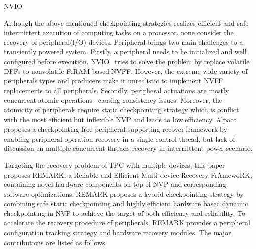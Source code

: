 NVIO~\cite{li2016hw}


Although the above mentioned checkpointing strategies realizes efficient and safe intermittent execution of computing tasks on a processor, none consider the recovery of peripheral(I/O) devices.
Peripheral brings two main challenges to a transiently powered system.
Firstly, a peripheral needs to be initialized and well configured before execution. 
NVIO~\cite{li2016hw} tries to solve the problem by replace volatile DFFs to nonvolatile FeRAM based NVFF. 
However, the extreme wide variety of peripherals types and producers make it unrealistic to implement NVFF replacements to all peripherals. 
Secondly, peripheral actuations are mostly concurrent atomic operations~\cite{LuciaSurvey} causing consistency issues.
Moreover, the atomicity of peripherals require static checkpointing strategy which is conflict with the most efficient but inflexible NVP and leads to low efficiency.
Alpaca~\cite{lucia2017Alpaca} proposes a checkpointing-free peripheral supporting recover framework by enabling peripheral operation recovery in a single control thread, but lack of discussion on multiple concurrent threads recovery in intermittent power scenario.

Targeting the recovery problem of TPC with multiple devices, this paper proposes REMARK, a \underline{R}eliable and \underline{E}fficient \underline{M}ulti-device Recovery Fr\underline{A}mewo\underline{RK}, containing novel hardware components on top of NVP and corresponding software optimizations.
REMARK proposes a hybrid checkpointing strategy by combining safe static checkpointing and highly efficient hardware based dynamic checkpointing in NVP to achieve the target of both efficiency and reliability.
To accelerate the recovery procedure of peripherals, REMARK provides a peripheral configuration tracking strategy and hardware recovery modules.
The major contributions are listed as follows.


